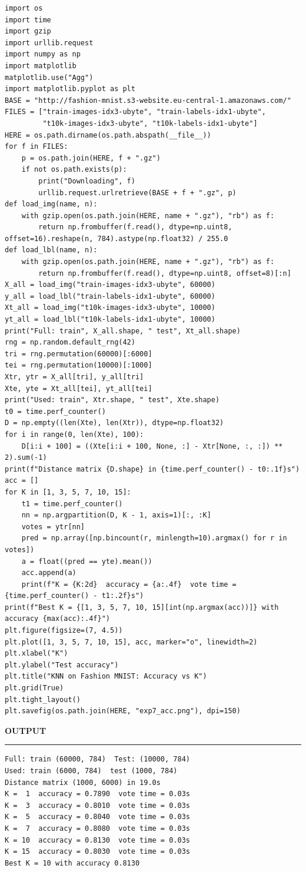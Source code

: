 \documentclass[11pt,twoside]{article}
\newcommand{\expheading}[1]{{\fontsize{14}{17}\selectfont\textbf{#1}\par}}
\begin{document}
\begin{lstlisting}
import os
import time
import gzip
import urllib.request
import numpy as np
import matplotlib
matplotlib.use("Agg")
import matplotlib.pyplot as plt
BASE = "http://fashion-mnist.s3-website.eu-central-1.amazonaws.com/"
FILES = ["train-images-idx3-ubyte", "train-labels-idx1-ubyte",
         "t10k-images-idx3-ubyte", "t10k-labels-idx1-ubyte"]
HERE = os.path.dirname(os.path.abspath(__file__))
for f in FILES:
    p = os.path.join(HERE, f + ".gz")
    if not os.path.exists(p):
        print("Downloading", f)
        urllib.request.urlretrieve(BASE + f + ".gz", p)
def load_img(name, n):
    with gzip.open(os.path.join(HERE, name + ".gz"), "rb") as f:
        return np.frombuffer(f.read(), dtype=np.uint8, offset=16).reshape(n, 784).astype(np.float32) / 255.0
def load_lbl(name, n):
    with gzip.open(os.path.join(HERE, name + ".gz"), "rb") as f:
        return np.frombuffer(f.read(), dtype=np.uint8, offset=8)[:n]
X_all = load_img("train-images-idx3-ubyte", 60000)
y_all = load_lbl("train-labels-idx1-ubyte", 60000)
Xt_all = load_img("t10k-images-idx3-ubyte", 10000)
yt_all = load_lbl("t10k-labels-idx1-ubyte", 10000)
print("Full: train", X_all.shape, " test", Xt_all.shape)
rng = np.random.default_rng(42)
tri = rng.permutation(60000)[:6000]
tei = rng.permutation(10000)[:1000]
Xtr, ytr = X_all[tri], y_all[tri]
Xte, yte = Xt_all[tei], yt_all[tei]
print("Used: train", Xtr.shape, " test", Xte.shape)
t0 = time.perf_counter()
D = np.empty((len(Xte), len(Xtr)), dtype=np.float32)
for i in range(0, len(Xte), 100):
    D[i:i + 100] = ((Xte[i:i + 100, None, :] - Xtr[None, :, :]) ** 2).sum(-1)
print(f"Distance matrix {D.shape} in {time.perf_counter() - t0:.1f}s")
acc = []
for K in [1, 3, 5, 7, 10, 15]:
    t1 = time.perf_counter()
    nn = np.argpartition(D, K - 1, axis=1)[:, :K]
    votes = ytr[nn]
    pred = np.array([np.bincount(r, minlength=10).argmax() for r in votes])
    a = float((pred == yte).mean())
    acc.append(a)
    print(f"K = {K:2d}  accuracy = {a:.4f}  vote time = {time.perf_counter() - t1:.2f}s")
print(f"Best K = {[1, 3, 5, 7, 10, 15][int(np.argmax(acc))]} with accuracy {max(acc):.4f}")
plt.figure(figsize=(7, 4.5))
plt.plot([1, 3, 5, 7, 10, 15], acc, marker="o", linewidth=2)
plt.xlabel("K")
plt.ylabel("Test accuracy")
plt.title("KNN on Fashion MNIST: Accuracy vs K")
plt.grid(True)
plt.tight_layout()
plt.savefig(os.path.join(HERE, "exp7_acc.png"), dpi=150)
\end{lstlisting}

\newpage
\expheading{OUTPUT}
\vspace{2pt}
\noindent\rule{\textwidth}{0.5pt}\par
\vspace{4pt}
\begin{verbatim}
Full: train (60000, 784)  Test: (10000, 784)
Used: train (6000, 784)  test (1000, 784)
Distance matrix (1000, 6000) in 19.0s
K =  1  accuracy = 0.7890  vote time = 0.03s
K =  3  accuracy = 0.8010  vote time = 0.03s
K =  5  accuracy = 0.8040  vote time = 0.03s
K =  7  accuracy = 0.8080  vote time = 0.03s
K = 10  accuracy = 0.8130  vote time = 0.03s
K = 15  accuracy = 0.8030  vote time = 0.03s
Best K = 10 with accuracy 0.8130
\end{verbatim}
\vspace{4pt}
\end{document}
